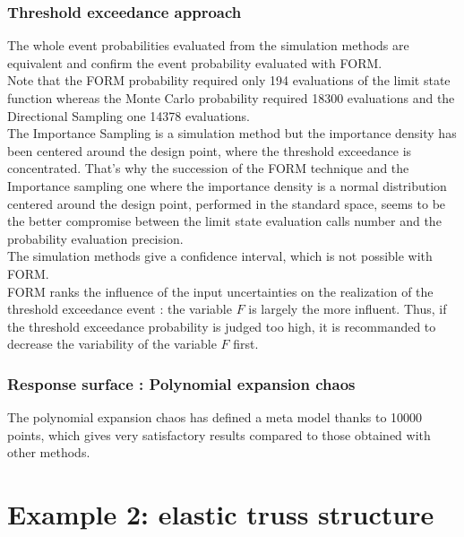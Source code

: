 \documentclass[11pt]{article}
\begin{document}
\subsubsection{Threshold exceedance approach}

The whole event probabilities evaluated from the simulation methods are equivalent and confirm the event probability evaluated with FORM.\\

Note that the FORM probability required only 194 evaluations of the limit state function whereas the Monte Carlo probability required 18300 evaluations and the Directional Sampling one 14378 evaluations.\\
The Importance Sampling is a simulation method but the importance density has been centered around the design point, where the threshold exceedance is concentrated. That's why the succession of the FORM technique and the Importance sampling one where the importance density is a normal distribution centered around the design point, performed in the standard space, seems to be the better compromise between the limit state evaluation calls number and the probability evaluation precision.\\

The simulation methods give a confidence interval, which is not possible with FORM.\\

FORM ranks the influence of the input uncertainties on the realization of the threshold exceedance event : the variable $F$ is largely the more influent. Thus, if the threshold exceedance probability is judged too high, it is recommanded to decrease the variability of the variable $F$ first.


\subsubsection{Response surface : Polynomial expansion chaos}

The polynomial expansion chaos has defined a meta model thanks to 10000 points, which gives very satisfactory results compared to those obtained with other methods.




\newpage
\section{Example 2: elastic truss structure}
\end{document}

